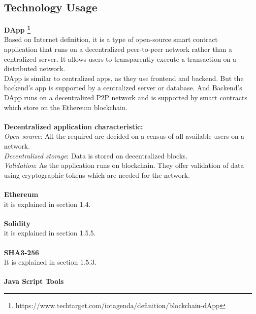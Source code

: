 \subsection{Technology Usage}
\textbf{DApp \footnote{https://www.techtarget.com/iotagenda/definition/blockchain-dApp}} \\
Based on Internet definition, it is a type of open-source smart contract application that runs on a decentralized peer-to-peer network rather than a centralized server. It allows users to transparently execute a transaction on a distributed network. \\
DApp is similar to centralized apps, as they use frontend and backend. But the backend's app is supported by a centralized server or database. And Backend's DApp runs on a decentralized P2P network and is supported by smart contracts which store on the Ethereum blockchain.\\
\\
\textbf{Decentralized application characteristic:}\\
	\textit{Open source}: All the required are decided on a census of all available users on a network.\\
	\textit{Decentralized storage}: Data is stored on decentralized blocks.\\
	\textit{Validation}: As the application runs on blockchain. They offer validation of data using cryptographic tokens which are needed for the network. \\
 \\
\textbf{Ethereum} \\
it is explained in section 1.4.\\
\\
\textbf{Solidity} \\
it is explained in section 1.5.5.\\
\\
\textbf{SHA3-256} \\It is explained in section 1.5.3.\\
\\
\textbf{Java Script Tools} 
